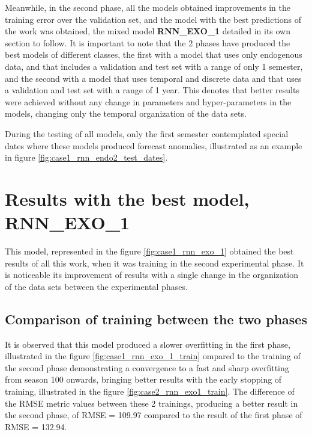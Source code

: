        Meanwhile, in the second phase, all the models obtained improvements in the training error over the validation set, and the model with the best predictions of the work was obtained, the mixed model  \textbf{RNN\_EXO\_1} detailed in its own section to follow.
        It is important to note that the 2 phases have produced the best models of different classes, the first with a model that uses only endogenous data, and that includes a validation and test set with a range of only 1 semester, and the second with a model that uses temporal and discrete data and that uses a validation and test set with a range of 1 year.
        This denotes that better results were achieved without any change in parameters and hyper-parameters in the models, changing only the temporal organization of the data sets.
        
        During the testing of all models, only the first semester contemplated special dates where these models produced forecast anomalies, illustrated as an example in figure \ref{fig:case1_rnn_endo2_test_dates}.

\section{Results with the best model, RNN\_EXO\_1}
     This model, represented in the figure  \ref{fig:case1_rnn_exo_1} obtained the best results of all this work, when it was training in the second experimental phase.
    It is noticeable its improvement of results with a single change in the organization of the data sets between the experimental phases.
    
    \subsection{Comparison of training between the two phases}
   
     It is observed that this model produced a slower overfitting in the first phase, illustrated in the figure \ref{fig:case1_rnn_exo_1_train} ompared to the training of the second phase demonstrating a convergence to a fast and sharp overfitting from season 100 onwards, bringing better results with the early stopping of training, illustrated in the figure \ref{fig:case2_rnn_exo1_train}. The difference of the RMSE metric values between these 2 trainings, producing a better result in the second phase, of RMSE = 109.97 compared to the result of the first phase of RMSE = 132.94.
     

